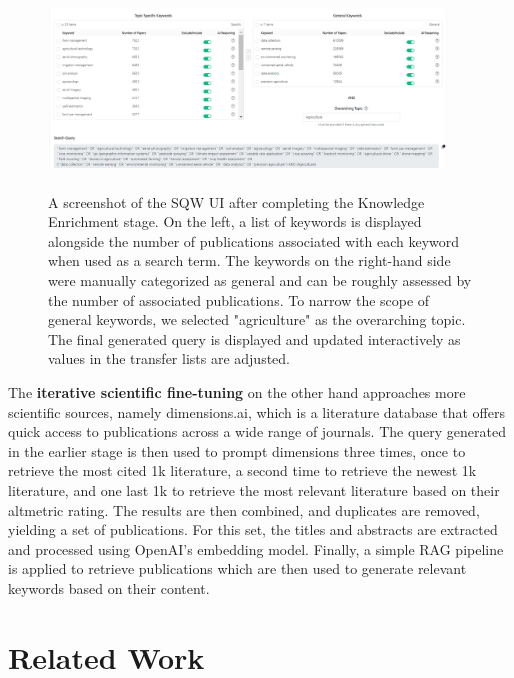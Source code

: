 \begin{figure}
	\centering
	\includegraphics[height=200px, width=400px]{pics/sqw-stage1.png}
	\caption[SQW Knowledge Enrichment]{A screenshot of the SQW UI after completing the Knowledge Enrichment stage. On the left, a list of keywords is displayed alongside the number of publications associated with each keyword when used as a search term. The keywords on the right-hand side were manually categorized as general and can be roughly assessed by the number of associated publications. To narrow the scope of general keywords, we selected "agriculture" as the overarching topic. The final generated query is displayed and updated interactively as values in the transfer lists are adjusted.}
	\label{fig:sqw-stage1}
\end{figure}


The \textbf{iterative scientific fine-tuning} on the other hand approaches more scientific sources, namely dimensions.ai, which is a literature database that offers quick access to publications across a wide range of journals. The query generated in the earlier stage is then used to prompt dimensions three times, once to retrieve the most cited 1k literature, a second time to retrieve the newest 1k literature, and one last 1k to retrieve the most relevant literature based on their altmetric rating. The results are then combined, and duplicates are removed, yielding a set of publications. For this set, the titles and abstracts are extracted and processed using OpenAI's embedding model. Finally, a simple RAG pipeline is applied to retrieve publications which are then used to generate relevant keywords based on their content.

\section{Related Work}\label{sec:relwork}

